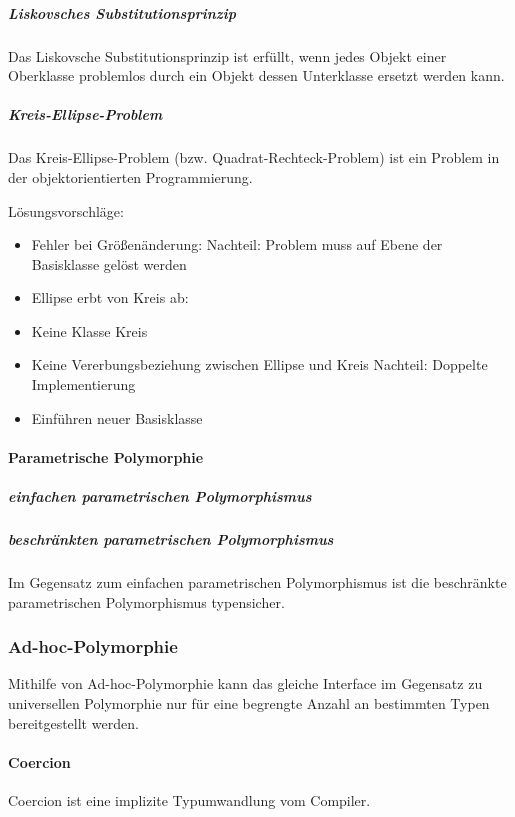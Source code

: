 				\subparagraph{Liskovsches Substitutionsprinzip}
					Das Liskovsche Substitutionsprinzip ist erfüllt, wenn jedes Objekt einer Oberklasse problemlos durch ein
					Objekt dessen Unterklasse ersetzt werden kann.
					
					\subparagraph{Kreis-Ellipse-Problem}
						Das Kreis-Ellipse-Problem (bzw. Quadrat-Rechteck-Problem) ist ein Problem in der objektorientierten
						Programmierung.
						
						Lösungsvorschläge:
						
						\begin{itemize}
							\item Fehler bei Größenänderung:
								Nachteil: Problem muss auf Ebene der Basisklasse gelöst werden
							\item Ellipse erbt von Kreis ab:
							
							\item Keine Klasse Kreis
							
							\item Keine Vererbungsbeziehung zwischen Ellipse und Kreis
								Nachteil: Doppelte Implementierung
							\item Einführen neuer Basisklasse
							
						\end{itemize}
			
				
			\paragraph{Parametrische Polymorphie}
				\subparagraph{einfachen parametrischen Polymorphismus}
				
				\subparagraph{beschränkten parametrischen Polymorphismus}
					Im Gegensatz zum einfachen parametrischen Polymorphismus ist die beschränkte parametrischen Polymorphismus
					typensicher.
					
			
		\subsubsection{Ad-hoc-Polymorphie}
			Mithilfe von Ad-hoc-Polymorphie kann das gleiche Interface im Gegensatz zu universellen Polymorphie nur für eine
			begrengte Anzahl an bestimmten Typen bereitgestellt werden.
		
			\paragraph{Coercion}
				Coercion ist eine implizite Typumwandlung vom Compiler.
			
